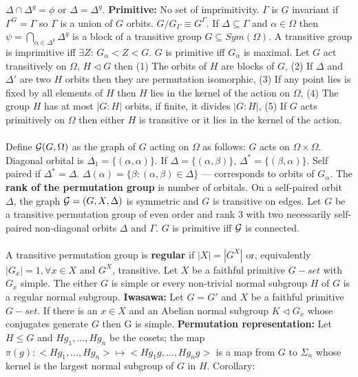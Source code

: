 $\Delta \cap \Delta^g = \phi$ or
$\Delta = \Delta^g$.  {\bf Primitive:} No set of imprimitivity.
$\Gamma$ is $G$ invariant if $\Gamma^G= \Gamma$ so $\Gamma$ is a union of $G$ orbits.
$G/G_{\Gamma} \equiv G^{\Gamma}$.
If $\Delta \subseteq \Gamma$ and $\alpha \in \Omega$ then 
$\psi = \bigcap_{\alpha \in \Delta^g} \Delta^g$ is a block of a transitive
group $G \subseteq Sym(\Omega)$.
A transitive group is imprimitive iff $\exists Z$: $G_{\alpha} < Z < G$.
$G$ is primitive iff $G_{\alpha}$ is maximal.
Let $G$ act transitively on $\Omega$, $H \lhd G$ then
(1) The orbits of $H$ are blocks of $G$,
(2) If $\Delta$ and $\Delta'$ are two $H$ orbits then they are permutation isomorphic,
(3) If any point lies is fixed by all elements of $H$ then $H$
lies in the kernel of the action on $\Omega$,
(4) The group $H$ has at most $|G:H|$ orbits, if finite, it divides $|G:H|$,
(5) If $G$ acts primitively on $\Omega$ then either $H$ is transitive or it
lies in the kernel of the action.\\
\\
Define ${\cal G}(G, \Omega )$ as the graph of $G$ acting on $\Omega$ as follows:
$G$ acts on $\Omega \times \Omega$.  Diagonal orbital is
$\Delta_1 = \{ (\alpha , \alpha )\}$. If $\Delta = \{ (\alpha , \beta ) \}$,
$\Delta^*= \{ (\beta, \alpha) \}$.  Self paired if $\Delta^* = \Delta$.
$\Delta(\alpha)= \{ \beta : (\alpha , \beta ) \in \Delta \}$ --- corresponds to 
orbits of $G_{\alpha}$. The {\bf rank of the permutation group} is number of orbitals.
On a self-paired orbit $\Delta$, the graph ${\cal G}=(G, X,\Delta)$ is 
symmetric and $G$ is transitive on edges.
Let $G$ be a transitive permutation group of even order and rank 3 with two
necessarily self-paired non-diagonal orbits $\Delta$ and $\Gamma$.  $G$ is primitive
iff ${\cal G}$ is connected.\\
\\
A transitive permutation group is {\bf regular} if $|X|= |G^X|$ or, equivalently 
$|G_x|=1, \forall x \in X$ and $G^X$, transitive.
Let $X$ be a faithful primitive $G-set$ with $G_x$ simple.  The either $G$ is simple or
every non-trivial normal subgroup $H$ of $G$ is a regular normal subgroup.
{\bf Iwasawa:}  Let $G=G'$ and
$X$ be a faithful primitive $G-set$.  If there is an $x \in X$ and an Abelian normal
subgroup $K \lhd G_x$ whose conjugates generate $G$ then G is simple.  {\bf Permutation
representation:} Let $H \le G$ and $Hg_1 , ..., Hg_n$ be the cosets; the map
$\pi(g): <Hg_1, ..., Hg_n> \mapsto <Hg_1 g, ..., Hg_n g>$ is a map from $G$ to $\Sigma_n$
whose kernel is the largest normal subgroup of $G$ in $H$.  Corollary:
